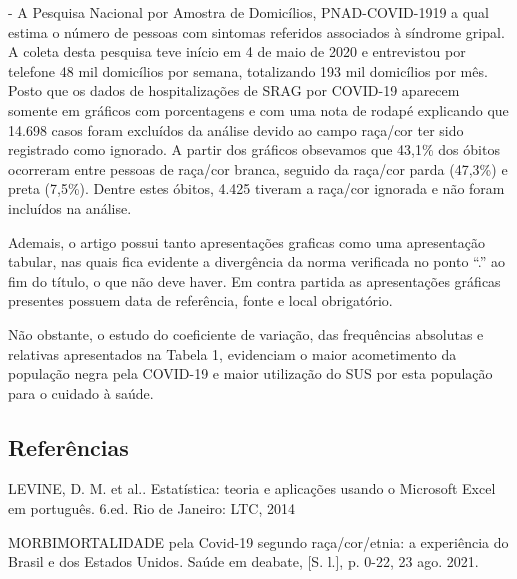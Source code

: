 \documentclass[12pt]{article}\usepackage[]{graphicx}\usepackage[]{color}
\begin{document}
            - A Pesquisa Nacional por Amostra de Domicílios, PNAD-COVID-1919 a qual estima o número de pessoas com sintomas referidos associados à síndrome gripal. A coleta desta pesquisa teve início em 4 de maio de 2020 e entrevistou por telefone 48 mil domicílios por semana, totalizando 193 mil domicílios por mês.
        Posto que os dados de hospitalizações de SRAG por COVID-19 aparecem somente em gráficos com porcentagens e com uma nota de rodapé explicando que 14.698 casos foram excluídos da análise devido ao campo raça/cor ter sido registrado como ignorado. A partir dos gráficos obsevamos que 43,1\% dos óbitos ocorreram entre pessoas de raça/cor branca, seguido da raça/cor parda (47,3\%) e preta (7,5\%). Dentre estes óbitos, 4.425 tiveram a raça/cor ignorada e não foram incluídos na análise.
        
        Ademais, o artigo possui tanto apresentações graficas como uma apresentação tabular, nas quais  fica evidente a divergência da norma verificada no ponto “.” ao fim do título, o que não deve haver. Em contra partida as apresentações gráficas presentes possuem data de referência, fonte e local obrigatório.
        
        Não obstante, o estudo do coeficiente de variação, das frequências absolutas e relativas apresentados na Tabela 1, evidenciam o maior acometimento da população negra pela COVID-19 e maior utilização do SUS por esta população para o cuidado à saúde.
        
        
\subsection{Referências}

LEVINE, D. M. et al.. Estatística: teoria e aplicações usando o Microsoft Excel em português.
6.ed. Rio de Janeiro: LTC, 2014

MORBIMORTALIDADE pela Covid-19 segundo raça/cor/etnia: a experiência do Brasil e dos Estados Unidos. Saúde em deabate, [S. l.], p. 0-22, 23 ago. 2021.
\end{document}
